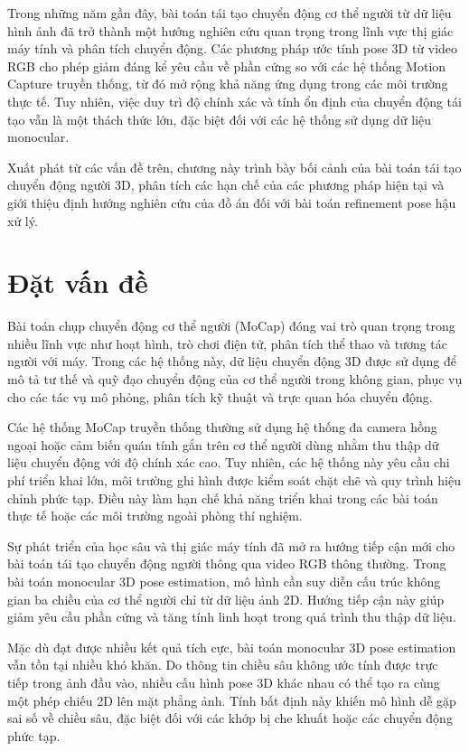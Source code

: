 \documentclass[../DoAn.tex]{subfiles}
\begin{document}
Trong những năm gần đây, bài toán tái tạo chuyển động cơ thể người từ dữ liệu hình ảnh đã trở thành một hướng nghiên cứu quan trọng trong lĩnh vực thị giác máy tính và phân tích chuyển động. Các phương pháp ước tính pose 3D từ video RGB cho phép giảm đáng kể yêu cầu về phần cứng so với các hệ thống Motion Capture truyền thống, từ đó mở rộng khả năng ứng dụng trong các môi trường thực tế. Tuy nhiên, việc duy trì độ chính xác và tính ổn định của chuyển động tái tạo vẫn là một thách thức lớn, đặc biệt đối với các hệ thống sử dụng dữ liệu monocular.

Xuất phát từ các vấn đề trên, chương này trình bày bối cảnh của bài toán tái tạo chuyển động người 3D, phân tích các hạn chế của các phương pháp hiện tại và giới thiệu định hướng nghiên cứu của đồ án đối với bài toán refinement pose hậu xử lý.

\section{Đặt vấn đề}
\label{sec:dvd}

Bài toán chụp chuyển động cơ thể người (MoCap) đóng vai trò quan trọng trong nhiều lĩnh vực như hoạt hình, trò chơi điện tử, phân tích thể thao và tương tác người với máy. Trong các hệ thống này, dữ liệu chuyển động 3D được sử dụng để mô tả tư thế và quỹ đạo chuyển động của cơ thể người trong không gian, phục vụ cho các tác vụ mô phỏng, phân tích kỹ thuật và trực quan hóa chuyển động.

Các hệ thống MoCap truyền thống thường sử dụng hệ thống đa camera hồng ngoại hoặc cảm biến quán tính gắn trên cơ thể người dùng nhằm thu thập dữ liệu chuyển động với độ chính xác cao. Tuy nhiên, các hệ thống này yêu cầu chi phí triển khai lớn, môi trường ghi hình được kiểm soát chặt chẽ và quy trình hiệu chỉnh phức tạp. Điều này làm hạn chế khả năng triển khai trong các bài toán thực tế hoặc các môi trường ngoài phòng thí nghiệm.

Sự phát triển của học sâu và thị giác máy tính đã mở ra hướng tiếp cận mới cho bài toán tái tạo chuyển động người thông qua video RGB thông thường. Trong bài toán monocular 3D pose estimation, mô hình cần suy diễn cấu trúc không gian ba chiều của cơ thể người chỉ từ dữ liệu ảnh 2D. Hướng tiếp cận này giúp giảm yêu cầu phần cứng và tăng tính linh hoạt trong quá trình thu thập dữ liệu.

Mặc dù đạt được nhiều kết quả tích cực, bài toán monocular 3D pose estimation vẫn tồn tại nhiều khó khăn. Do thông tin chiều sâu không ước tính được trực tiếp trong ảnh đầu vào, nhiều cấu hình pose 3D khác nhau có thể tạo ra cùng một phép chiếu 2D lên mặt phẳng ảnh. Tính bất định này khiến mô hình dễ gặp sai số về chiều sâu, đặc biệt đối với các khớp bị che khuất hoặc các chuyển động phức tạp.
\end{document}
